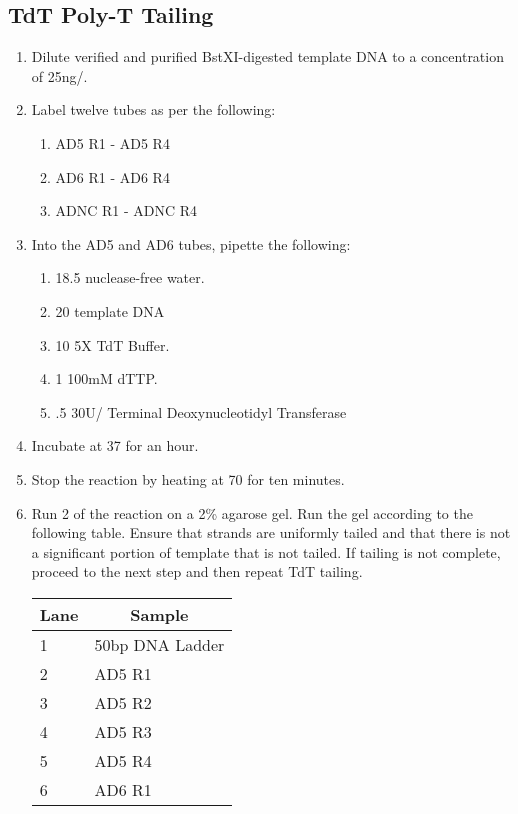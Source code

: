\documentclass{ssiBio}
\begin{document}
\subsection{TdT Poly-T Tailing}
\begin{enumerate}
  \item{Dilute verified and purified BstXI-digested template DNA to a concentration of 25ng/\uL{}.}
  \item{Label twelve tubes as per the following:}
  \begin{enumerate}
    \item{AD5 R1 - AD5 R4}
    \item{AD6 R1 - AD6 R4}
    \item{ADNC R1 - ADNC R4}
  \end{enumerate}
  \item{Into the AD5 and AD6 tubes, pipette the following:}
  \begin{enumerate}
    \item{18.5\uL{} nuclease-free water.}
    \item{20\uL{} template DNA}
    \item{10\uL{} 5X TdT Buffer.}
    \item{1\uL{} 100mM dTTP.}
    \item{.5\uL{} 30U/\uL{} Terminal Deoxynucleotidyl Transferase}
  \end{enumerate}
  \item{Incubate at 37\C{} for an hour.}
  \item{Stop the reaction by heating at 70\C{} for ten minutes.}
  \stopPoint{}
  \item{Run 2\uL{} of the reaction on a 2\% agarose gel. Run the gel according to the following table. Ensure that strands are uniformly tailed and that there is not a significant portion of template that is not tailed. If tailing is not complete, proceed to the next step and then repeat TdT tailing.}
    \begin{table}[ht]
    \centering
    \begin{tabular}{|l|l|}
    \hline
    \multicolumn{1}{|c|}{\textbf{Lane}} & \multicolumn{1}{c|}{\textbf{Sample}} \\ \hline
    1 & 50bp DNA Ladder \\ \hline
    2 & AD5 R1 \\ \hline
    3 & AD5 R2 \\ \hline
    4 & AD5 R3 \\ \hline
    5 & AD5 R4 \\ \hline
    6 & AD6 R1 \\ \hline

\end{tabular}
\end{table}
\end{enumerate}
\end{document}
